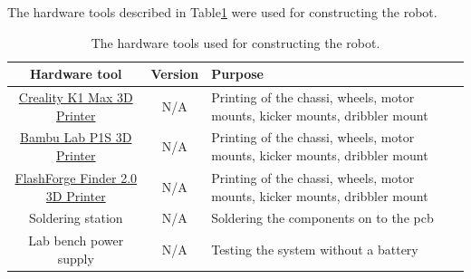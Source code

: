The hardware tools described in Table\:\ref{tab:hardware_tools} were used for constructing the robot.
\begin{table}[H]
	\centering
	\caption{The hardware tools used for constructing the robot.}
	\label{tab:hardware_tools}
	\begin{tabularx}{\textwidth}{|c|c|X|} \hline
		\rowcolor{light_grey} \textbf{Hardware tool}                                                                       & \textbf{Version} & \textbf{Purpose}                                                            \\ \hline
		\href{https://www.creality.com/products/creality-k1-max-3d-printer}{Creality K1 Max 3D Printer}                    & N/A              & Printing of the chassi, wheels, motor mounts, kicker mounts, dribbler mount \\ \hline
		\href{https://eu.store.bambulab.com/en-se/products/p1s}{Bambu Lab P1S 3D Printer}                                  & N/A              & Printing of the chassi, wheels, motor mounts, kicker mounts, dribbler mount \\ \hline
		\href{https://www.clasohlson.com/se/3D-skrivare-FlashForge-Finder-2.0/p/38-9154}{FlashForge Finder 2.0 3D Printer} & N/A              & Printing of the chassi, wheels, motor mounts, kicker mounts, dribbler mount \\ \hline
		Soldering station                                                                                                  & N/A              & Soldering the components on to the \acs{pcb}                                \\ \hline
		Lab bench power supply                                                                                             & N/A              & Testing the system without a battery                                        \\ \hline
	\end{tabularx}
\end{table}

